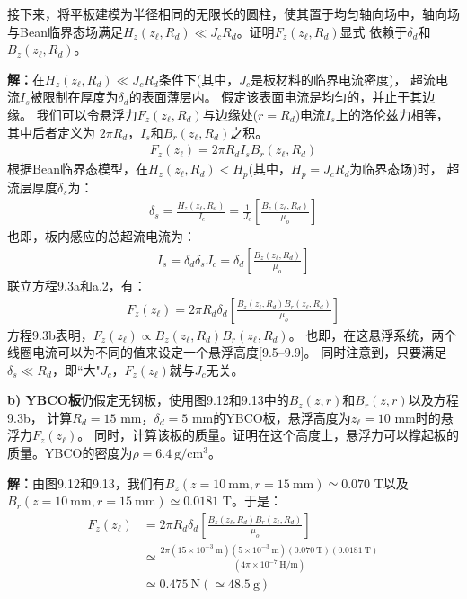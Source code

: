 接下来，将平板建模为半径相同的无限长的圆柱，使其置于均匀轴向场中，轴向场
与Bean临界态场满足$H_z(z_\ell,R_d)\ll J_c R_d$。证明$F_z(z_\ell,R_d)$显式
依赖于$\delta_d$和$B_z(z_\ell,R_d)$。

\textbf{解：}在$H_z(z_\ell,R_d)\ll J_c R_d$条件下(其中，$J_c$是板材料的临界电流密度)，
超流电流$I_s$被限制在厚度为$\delta_d$的表面薄层内。
假定该表面电流是均匀的，并止于其边缘。
我们可以令悬浮力$F_z(z_\ell,R_d)$与边缘处($r=R_d$)电流$I_s$上的洛伦兹力相等，其中后者定义为
$2\pi R_d，I_s$和$B_r(z_\ell,R_d)$之积。
\begin{align*}%
F_{z}(z_{\ell})=2\pi R_{d}I_{s}B_{r}(z_{\ell},R_{d})\tag{9.3a}
\end{align*}
根据Bean临界态模型，在$H_z(z_\ell,R_d)<H_p$(其中，$H_p=J_c R_d$为临界态场)时，
超流层厚度$\delta_{s}$为：
\begin{align*}%
\delta_{s}=\frac{H_{z}(z_{\ell},R_{d})}{J_{c}}=\frac{1}{J_{c}}[\frac{B_{z}(z_{\ell},R_{d})}{\mu_{o}}]\tag{a.1}
\end{align*}
也即，板内感应的总超流电流为：
\begin{align*}%
I_{s}=\delta_{d}\delta_{s}J_{c}=\delta_{d}[\frac{B_{z}(z_{\ell},R_{d})}{\mu_{o}}]\tag{a.2}
\end{align*}
联立方程9.3a和a.2，有：
\begin{align*}%
F_{z}(z_{\ell})=2\pi R_{d}\delta_{d}[\frac{B_{z}(z_{\ell},R_{d})B_{r}(z_{\ell},R_{d})}{\mu_{o}}]\tag{9.3b}
\end{align*}
方程9.3b表明，$F_z(z_\ell)\propto B_z(z_\ell,R_d)B_r(z_\ell,R_d)$。
也即，在这悬浮系统，两个线圈电流可以为不同的值来设定一个悬浮高度[9.5--9.9]。
同时注意到，只要满足$\delta_{s}\ll R_d$，即``大"$J_c$，$F_z(z_\ell)$就与$J_c$无关。

\textbf{b) YBCO板}\qquad 仍假定无钢板，使用图9.12和9.13中的$B_z(z,r)$和$B_r(z,r)$以及方程9.3b，
计算$R_d=15$ mm，$\delta_d=5$ mm的YBCO板，悬浮高度为$z_\ell=10$ mm时的悬浮力$F_z(z_\ell)$。
同时，计算该板的质量。证明在这个高度上，悬浮力可以撑起板的质量。YBCO的密度为$\rho=6.4\ \mathrm{g/cm^3}$。

\textbf{解：}由图9.12和9.13，我们有$B_z(z=10\ \mathrm{mm},r=15\ \mathrm{mm})\simeq 0.070$ T以及
$B_r(z=10\ \mathrm{mm},r=15\ \mathrm{mm})\simeq 0.0181$ T。于是：
\begin{align*}%
F_{z}(z_{\ell})&=2\pi R_{d}\delta_{d}[\frac{B_{z}(z_{\ell},R_{d})B_{r}(z_{\ell},R_{d})}{\mu_{o}}]\\ \tag{9.3b}
&\simeq\frac{2\pi(15\times 10^{-3}\ \mathrm{m})(5\times 10^{-3}\ \mathrm{m})(0.070\ \mathrm{T})(0.0181\ \mathrm{T})}{(4\pi\times 10^{-7}\ \mathrm{H/m})}\\
&\simeq 0.475\ \mathrm{N}(\simeq 48.5\ \mathrm{g})
\end{align*}

